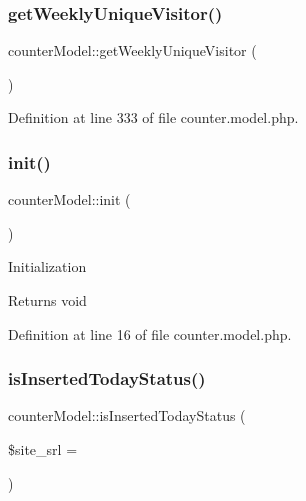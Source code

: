 \mbox{\label{classcounterModel_ad43ae0f93cd42e9a59262abfe296fb9a}} 
\subsubsection{\texorpdfstring{get\+Weekly\+Unique\+Visitor()}{getWeeklyUniqueVisitor()}}
{\footnotesize\ttfamily counter\+Model\+::get\+Weekly\+Unique\+Visitor (\begin{DoxyParamCaption}{ }\end{DoxyParamCaption})}



Definition at line 333 of file counter.\+model.\+php.

\mbox{\label{classcounterModel_a3131ee0122d97e0b7d39d6d31a7227dc}} 
\subsubsection{\texorpdfstring{init()}{init()}}
{\footnotesize\ttfamily counter\+Model\+::init (\begin{DoxyParamCaption}{ }\end{DoxyParamCaption})}

Initialization

\begin{DoxyReturn}{Returns}
void 
\end{DoxyReturn}


Definition at line 16 of file counter.\+model.\+php.

\mbox{\label{classcounterModel_ad2e64d22eb37f58e91a37ebb1f421d35}} 
\subsubsection{\texorpdfstring{is\+Inserted\+Today\+Status()}{isInsertedTodayStatus()}}
{\footnotesize\ttfamily counter\+Model\+::is\+Inserted\+Today\+Status (\begin{DoxyParamCaption}\item[{}]{\$site\+\_\+srl = {} }\end{DoxyParamCaption})}

